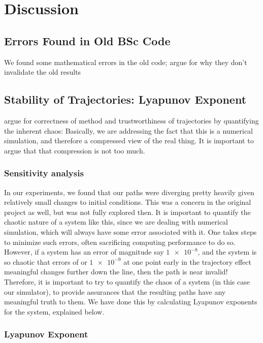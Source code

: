
\chapter{Discussion}

\section{Errors Found in Old BSc Code}
We found some mathematical errors in the old code; argue for why they don’t invalidate the old results

\section{Stability of Trajectories: Lyapunov Exponent}
argue for correctness of method and trustworthiness of trajectories by quantifying the inherent chaos: Basically, we are addressing the fact that this is a numerical simulation, and therefore a compressed view of the real thing. It is important to argue that that compression is not too much.

\subsection{Sensitivity analysis}

In our experiments, we found that our paths were diverging pretty heavily given relatively small changes to initial conditions. This was a concern in the original project as well, but was not fully explored then. It is important to quantify the chaotic nature of a system like this, since we are dealing with numerical simulation, which will always have some error associated with it. One takes steps to minimize such errors, often sacrificing computing performance to do so. However, if a system has an error of magnitude say \(\num{1e-8}\), and the system is so chaotic that errors of or \(\num{1e-9}\) at one point early in the trajectory effect meaningful changes further down the line, then the path is near invalid! Therefore, it is important to try to quantify the chaos of a system (in this case our simulator), to provide assurances that the resulting paths have any meaningful truth to them. We have done this by calculating Lyapunov exponents for the system, explained below.

\subsection{Lyapunov Exponent}

